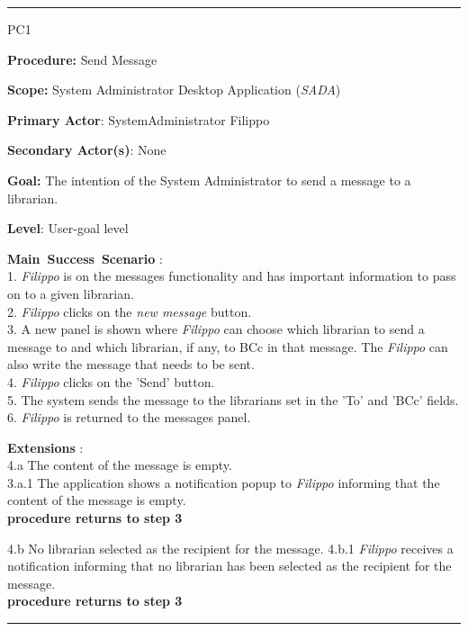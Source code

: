 \vspace{0.5cm}
\hrule
\begin{lyxlist}{PC1}
\small{
\item [\textbf{Procedure:}] Send Message
\item [\textbf{Scope:}] System Administrator Desktop Application (\emph{SADA})
\item [\textbf{Primary Actor}:] SystemAdministrator Filippo
\item [\textbf{Secondary Actor(s)}:] None
\item [\textbf{Goal:}] The intention of the System Administrator to send a
message to a librarian.
\item [\textbf{Level}:] User-goal level
\item [\textbf{Main~Success~Scenario}]:\\
1. \emph{Filippo} is on the messages functionality and has important
information to pass on to a given librarian.
\\
2. \emph{Filippo} clicks on the \emph{new message} button. \\
3. A new panel is shown where \emph{Filippo} can choose which librarian to
send a message to and which librarian, if any, to BCc in that message. The
\emph{Filippo} can also write the message that needs to be sent.
\\
4. \emph{Filippo} clicks on the 'Send' button. \\
5. The system sends the message to the librarians set in
the 'To' and 'BCc' fields. \\
6. \emph{Filippo} is returned to the messages panel. \\



\item [\textbf{Extensions}]: \\
4.a The content of the message is empty.\\
\hspace*{0.5cm} 3.a.1 The application shows a notification popup to
\emph{Filippo} informing that the content of the message is empty. \\
\hspace*{0.5cm} \textbf{procedure returns to step 3}

4.b No librarian selected as the recipient for the message.
\hspace*{0.5cm} 4.b.1 \emph{Filippo} receives a notification informing that
no librarian has been selected as the recipient for the message.\\
\hspace*{0.5cm} \textbf{procedure returns to step 3}}

\end{lyxlist}
\hrule

